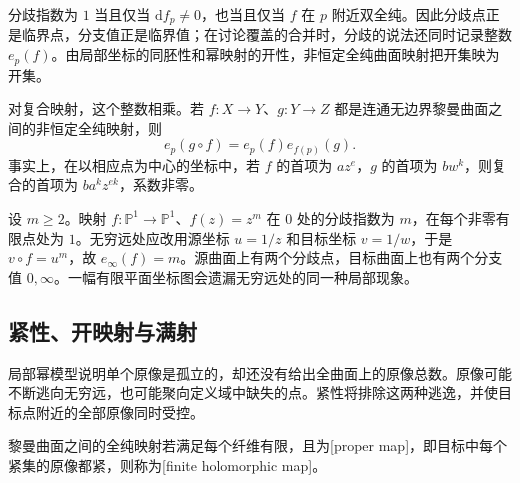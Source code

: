 分歧指数为 \(1\) 当且仅当 \(\mathrm{d}f_p\neq0\)，也当且仅当 \(f\) 在 \(p\) 附近双全纯。因此分歧点正是临界点，分支值正是临界值；在讨论覆盖的合并时，分歧的说法还同时记录整数 \(e_p(f)\)。由局部坐标的同胚性和幂映射的开性，非恒定全纯曲面映射把开集映为开集。

\ProseParagraphBreak

对复合映射，这个整数相乘。若 \(f:X\rightarrow Y\)、\(g:Y\rightarrow Z\) 都是连通无边界黎曼曲面之间的非恒定全纯映射，则
\begin{equation}\label{g4:eq:0202:ramification-composition}
	e_p(g\circ f)=e_p(f)e_{f(p)}(g).
\end{equation}
事实上，在以相应点为中心的坐标中，若 \(f\) 的首项为 \(a z^e\)，\(g\) 的首项为 \(b w^k\)，则复合的首项为 \(ba^kz^{ek}\)，系数非零。

\begin{example}\label{g4:exm:0202:power-sphere}
	设 \(m\geq2\)。映射 \(f:\mathbb P^1\rightarrow\mathbb P^1\)、\(f(z)=z^m\) 在 \(0\) 处的分歧指数为 \(m\)，在每个非零有限点处为 \(1\)。无穷远处应改用源坐标 \(u=1/z\) 和目标坐标 \(v=1/w\)，于是 \(v\circ f=u^m\)，故 \(e_\infty(f)=m\)。源曲面上有两个分歧点，目标曲面上也有两个分支值 \(0,\infty\)。一幅有限平面坐标图会遗漏无穷远处的同一种局部现象。
\end{example}

\subsection{紧性、开映射与满射}
\label{g4:subsec:0202:02}
局部幂模型说明单个原像是孤立的，却还没有给出全曲面上的原像总数。原像可能不断逃向无穷远，也可能聚向定义域中缺失的点。紧性将排除这两种逃逸，并使目标点附近的全部原像同时受控。

\begin{definition}\label{g4:def:0202:finite-map}
	黎曼曲面之间的全纯映射若满足每个纤维有限，且为[proper map]，即目标中每个紧集的原像都紧，则称为[finite holomorphic map]。
\end{definition}

